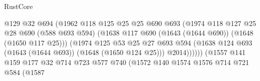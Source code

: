 \begin{lexlean}{RustCore}
\begin{coremodule}
                                          @129
                                          @32
                                          @694
                                          (@1962
                                            @118
                                            @125
                                            @25
                                            @25
                                            @690
                                            @693
                                            (@1974
                                              @118
                                              @127
                                              @25
                                              @28
                                              @690
                                              (@588 @693 @594)
                                              (@1638
                                                @117
                                                @690
                                                (@1643 (@1644 @690))
                                                (@1648 (@1650 @117 @25)))
                                              (@1974
                                                @125
                                                @53
                                                @25
                                                @27
                                                @693
                                                @594
                                                (@1638
                                                  @124
                                                  @693
                                                  (@1643 (@1644 @693))
                                                  (@1648 (@1650 @124 @25)))
                                                @2014))))))
                                    (@1557
                                      @141
                                      @159
                                      @177
                                      @32
                                      @714
                                      @723
                                      @577
                                      @740
                                      (@1572
                                        @140
                                        @1574
                                        @1576
                                        @714
                                        @721
                                        @584
                                        (@1587

\end{coremodule}
\end{lexlean}
